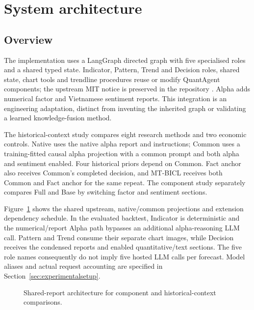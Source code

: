 \section{System architecture}
\label{sec:systemarchitecture}
\subsection{Overview}
The implementation uses a LangGraph \cite{langgraph_docs} directed graph with five specialised roles and a shared typed state. Indicator, Pattern, Trend and Decision roles, shared state, chart tools and trendline procedures reuse or modify QuantAgent components; the upstream MIT notice is preserved in the repository \cite{xiong2025quantagent}. Alpha adds numerical factor and Vietnamese sentiment reports. This integration is an engineering adaptation, distinct from inventing the inherited graph or validating a learned knowledge-fusion method.

The historical-context study compares eight research methods and two economic controls. Native uses the native alpha report and instructions; Common uses a training-fitted causal alpha projection with a common prompt and both alpha and sentiment enabled. Four historical priors depend on Common. Fact anchor also receives Common's completed decision, and MT-BICL receives both Common and Fact anchor for the same repeat. The component study separately compares Full and Base by switching factor and sentiment sections.

Figure~\ref{fig:flow} shows the shared upstream, native/common projections and extension dependency schedule. In the evaluated backtest, Indicator is deterministic and the numerical/report Alpha path bypasses an additional alpha-reasoning LLM call. Pattern and Trend consume their separate chart images, while Decision receives the condensed reports and enabled quantitative/text sections. The five role names consequently do not imply five hosted LLM calls per forecast. Model aliases and actual request accounting are specified in Section~\ref{sec:experimentalsetup}.

\begin{figure}[htb]
\centering

\caption{Shared-report architecture for component and historical-context comparisons.}
\label{fig:flow}
\end{figure}

